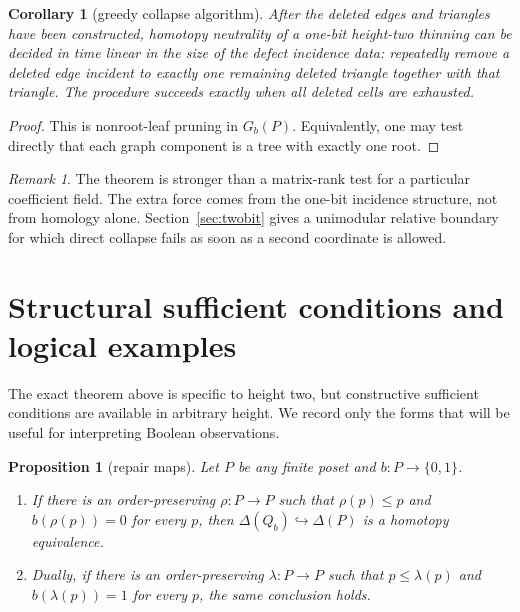 \documentclass[11pt]{article}
\newtheorem{proposition}[theorem]{Proposition}
\newtheorem{corollary}[theorem]{Corollary}
\theoremstyle{definition}
\theoremstyle{remark}
\newtheorem{remark}[theorem]{Remark}
\newcommand{\D}{\Delta}
\begin{document}
\begin{corollary}[greedy collapse algorithm]\label{cor:greedy}
After the deleted edges and triangles have been constructed, homotopy neutrality of a
one-bit height-two thinning can be decided in time linear in the size of the defect
incidence data: repeatedly remove a deleted edge incident to exactly one remaining
deleted triangle together with that triangle.  The procedure succeeds exactly when
all deleted cells are exhausted.
\end{corollary}

\begin{proof}
This is nonroot-leaf pruning in $G_b(P)$.  Equivalently, one may test directly that
each graph component is a tree with exactly one root.
\end{proof}

\begin{remark}
The theorem is stronger than a matrix-rank test for a particular coefficient field.
The extra force comes from the one-bit incidence structure, not from homology alone.
Section~\ref{sec:twobit} gives a unimodular relative boundary for which direct collapse
fails as soon as a second coordinate is allowed.
\end{remark}

\section{Structural sufficient conditions and logical examples}\label{sec:criteria}

The exact theorem above is specific to height two, but constructive sufficient
conditions are available in arbitrary height.  We record only the forms that will be
useful for interpreting Boolean observations.

\begin{proposition}[repair maps]\label{prop:repairmaps}
Let $P$ be any finite poset and $b:P\to\{0,1\}$.
\begin{enumerate}[label=(\alph*)]
\item If there is an order-preserving $\rho:P\to P$ such that
$\rho(p)\le p$ and $b(\rho(p))=0$ for every $p$, then
$\D(Q_b)\hookrightarrow\D(P)$ is a homotopy equivalence.
\item Dually, if there is an order-preserving $\lambda:P\to P$ such that
$p\le\lambda(p)$ and $b(\lambda(p))=1$ for every $p$, the same conclusion holds.
\end{enumerate}
\end{proposition}
\end{document}
